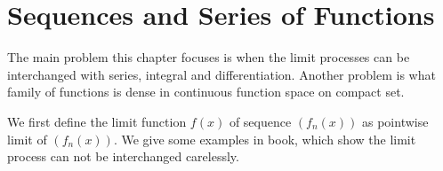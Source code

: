 % 
\chapter{Sequences and Series of Functions}
The main problem this chapter focuses is when the limit processes can be interchanged with series, integral and differentiation. Another problem is what family of functions is dense in continuous function space on compact set.\par
We first define the limit function $f(x)$ of sequence $(f_n(x))$ as pointwise limit of $(f_n(x))$. We give some examples in book, which show the limit process can not be interchanged carelessly.\par
